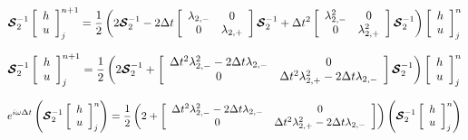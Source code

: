 \documentclass[12pt]{article}
\begin{document}
\[\boldsymbol{\mathcal{S}}_2^{-1}\left[\begin{array}{c}
h \\ u
\end{array}\right]^{n+1}_j = \frac{1}{2} \left(2\boldsymbol{\mathcal{S}}_2^{-1}  -2\Delta t \left[\begin{array}{c c}
\lambda_{2,-}  & 0 \\0  & \lambda_{2,+}
\end{array}\right] \boldsymbol{\mathcal{S}}_2^{-1} + \Delta t^2 \left[\begin{array}{c c}
\lambda_{2,-}^2  & 0 \\0  & \lambda_{2,+}^2
\end{array}\right] \boldsymbol{\mathcal{S}}_2^{-1} \right) \left[\begin{array}{c}
h \\ u
\end{array}\right]^{n}_j  \]

\[\boldsymbol{\mathcal{S}}_2^{-1}\left[\begin{array}{c}
h \\ u
\end{array}\right]^{n+1}_j = \frac{1}{2} \left(2\boldsymbol{\mathcal{S}}_2^{-1}  + \left[\begin{array}{c c}
\Delta t^2 \lambda_{2,-}^2  -2\Delta t\lambda_{2,-}  & 0 \\0  & \Delta t^2 \lambda_{2,+}^2 -2\Delta t\lambda_{2,-}
\end{array}\right] \boldsymbol{\mathcal{S}}_2^{-1} \right) \left[\begin{array}{c}
h \\ u
\end{array}\right]^{n}_j  \]

\[e^{i\omega\Delta t}\left(\boldsymbol{\mathcal{S}}_2^{-1}\left[\begin{array}{c}
h \\ u
\end{array}\right]^{n}_j \right) = \frac{1}{2} \left(2  + \left[\begin{array}{c c}
\Delta t^2 \lambda_{2,-}^2  -2\Delta t\lambda_{2,-}  & 0 \\0  & \Delta t^2 \lambda_{2,+}^2 -2\Delta t\lambda_{2,-}
\end{array}\right] \right) \left(\boldsymbol{\mathcal{S}}_2^{-1}\left[\begin{array}{c}
h \\ u
\end{array}\right]^{n}_j \right)  \]
\end{document}
